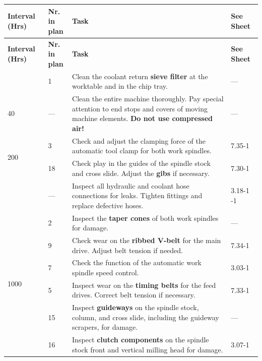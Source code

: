\renewcommand{\arraystretch}{1.3}
\begin{longtable}{|p{1.8cm}|p{1.2cm}|p{8.5cm}|p{2cm}|}
    \hline
    \textbf{Interval (Hrs)} & \textbf{Nr. in \newline plan} & \textbf{Task} & \textbf{See Sheet} \\
    \hline
    \endfirsthead

    \hline
    \textbf{Interval (Hrs)} & \textbf{Nr. in \newline plan} & \textbf{Task} & \textbf{See Sheet} \\
    \hline
    \endhead

    \hline
    \endfoot

    \multirow{1}{*}{8} & 1 & Clean the coolant return \textbf{sieve filter} at the worktable and in the chip tray. & --- \\
    \hline

    \multirow{1}{*}{40} & --- & Clean the entire machine thoroughly. Pay special attention to end stops and covers of moving machine elements. \textbf{Do not use compressed air!} & --- \\
    \hline

    \multirow{2}{*}{200} & 3 \newline 4 & Check and adjust the clamping force of the automatic tool clamp for both work spindles. & 7.35-1 \\
    \hline

    \multirow{2}{*}{500} & 18 & Check play in the guides of the spindle stock and cross slide. Adjust the \textbf{gibs} if necessary. & 7.30-1 \\
    \cline{2-4}
    & --- & Inspect all hydraulic and coolant hose connections for leaks. Tighten fittings and replace defective hoses. & 3.18-1 \newline 3.22-1 \\
    \hline

    \multirow{6}{*}{1000} & 2 \newline 17 & Inspect the \textbf{taper cones} of both work spindles for damage. & --- \\
    \cline{2-4}
    & 9 & Check wear on the \textbf{ribbed V-belt} for the main drive. Adjust belt tension if needed. & 7.34-1 \\
    \cline{2-4}
    & 7 & Check the function of the automatic work spindle speed control. & 3.03-1 \\
    \cline{2-4}
    & 5 \newline 10 \newline 14 & Inspect wear on the \textbf{timing belts} for the feed drives. Correct belt tension if necessary. & 7.33-1 \\
    \cline{2-4}
    & 15 & Inspect \textbf{guideways} on the spindle stock, column, and cross slide, including the guideway scrapers, for damage. & --- \\
    \cline{2-4}
    & 16 & Inspect \textbf{clutch components} on the spindle stock front and vertical milling head for damage. & 3.07-1 \\
    \hline
\end{longtable}

